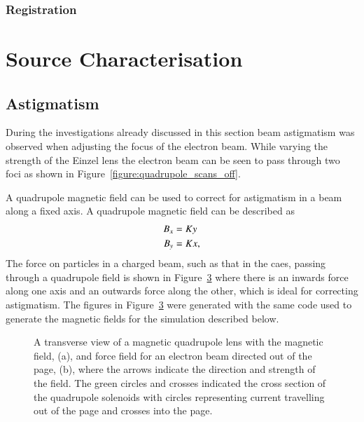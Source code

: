 \subsubsection{Registration}\label{section:registration}

\section{Source Characterisation}

\subsection{Astigmatism}

During the investigations already discussed in this section beam astigmatism was observed when adjusting the focus of the electron beam.
While varying the strength of the Einzel lens the electron beam can be seen to pass through two foci as shown in Figure~\ref{figure:quadrupole_scans_off}.

A quadrupole magnetic field can be used to correct for astigmatism in a beam along a fixed axis.
A quadrupole magnetic field can be described as
\begin{align}
B_x &= K y \notag\\
B_y &= K x,
\end{align}
The force on particles in a charged beam, such as that in the \gls{caes}, passing through a quadrupole field is shown in Figure~\ref{figure:quadrupole_example} where there is an inwards force along one axis and an outwards force along the other, which is ideal for correcting astigmatism.
The figures in Figure~\ref{figure:quadrupole_example} were generated with the same code used to generate the magnetic fields for the simulation described below.

\begin{figure}
    \centering
    \begin{subfigure}{0.49\linewidth}
    \centering
    
    \caption{}
    \label{figure:quadrupole_example_field}
    \end{subfigure}
    \begin{subfigure}{0.49\linewidth}
    \centering
    
    \caption{}
    \label{figure:quadrupole_example_force}
    \end{subfigure}
    \caption{A transverse view of a magnetic quadrupole lens with the magnetic field, (a), and force field for an electron beam directed out of the page, (b), where the arrows indicate the direction and strength of the field.
    The green circles and crosses indicated the cross section of the quadrupole solenoids with circles representing current travelling out of the page and crosses into the page.}
    \label{figure:quadrupole_example}
\end{figure}

